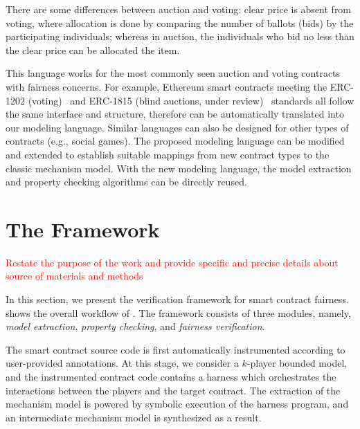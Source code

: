 There are some differences between auction and voting:
clear price is absent from voting, where allocation is done by comparing the number of ballots
(bids) by the participating individuals;
whereas in auction, the individuals who bid no less than the clear price can be allocated the item.

This language works for the most commonly seen auction and voting contracts with fairness concerns.
For example, Ethereum smart contracts meeting the ERC-1202 (voting)~\cite{erc-1202} and ERC-1815
(blind auctions, under review)~\cite{erc-1815} standards all follow the same interface and
structure, therefore can be automatically translated into our modeling language.
Similar languages can also be designed for other types of contracts (e.g., social games).
The proposed modeling language can be modified and extended to establish suitable mappings from new contract types to the classic mechanism model.
With the new modeling language, the model extraction and property checking algorithms can be
directly reused.


\section{The \tool Framework}\label{Sec_Method}
\textcolor{red}{Restate the purpose of the work and provide specific and precise details about source of materials and methods}

In this section, we present the \tool verification framework for smart contract fairness.
 shows the overall workflow of \tool.
The framework consists of three modules, namely, \emph{model extraction}, \emph{property checking},
and \emph{fairness verification}.

The smart contract source code is first automatically instrumented according to user-provided
annotations.
At this stage, we consider a $k$-player bounded model, and the instrumented contract code contains
a harness which orchestrates the interactions between the players and the target contract.
The extraction of the mechanism model is powered by symbolic execution of the harness program, and
an intermediate mechanism model is synthesized as a result.

